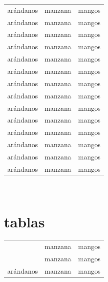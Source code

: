 \documentclass{report}
\begin{document}
\begin{longtable}{|c|c|c|}
	\hline
	arándanos & manzana & mangos \\
	arándanos & manzana & mangos \\
	\hline
	\hline
	arándanos & manzana & mangos \\
	\hline
	arándanos & manzana & mangos \\
	arándanos & manzana & mangos \\
	\hline
	\hline
	arándanos & manzana & mangos \\
	\hline
	arándanos & manzana & mangos \\
	arándanos & manzana & mangos \\
	\hline
	\hline
	arándanos & manzana & mangos \\
	\hline
	arándanos & manzana & mangos \\
	arándanos & manzana & mangos \\
	\hline
	\hline
	arándanos & manzana & mangos \\
	\hline
	arándanos & manzana & mangos \\
	arándanos & manzana & mangos \\
	\hline
\end{longtable}

\ \\[1cm]	
	
	
	
	
	
	
	
	
\section{tablas}	
	
	
	
	
	
	
	
	
\begin{tabular}{|c|c|c|}
	\hline
\rowcolor{green}	 & manzana & mangos \\
\hhline{|>{\arrayrulecolor{green}}->{\arrayrulecolor{black}}|-|-|}
\rowcolor{green} \multirow{-2}{*}{FRUTA}	 & manzana & mangos \\
	arándanos & manzana & mangos \\
	\hline
\end{tabular}
\end{document}
